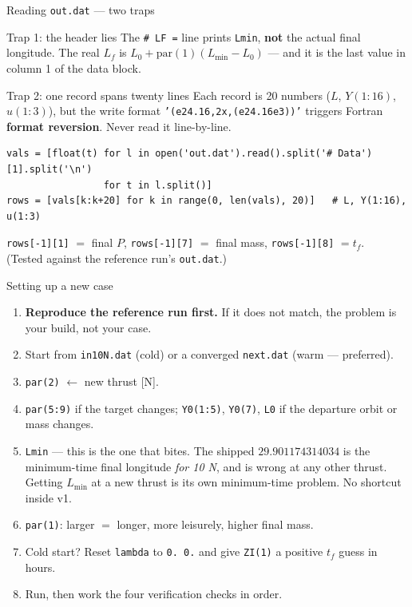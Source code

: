 \documentclass[10pt,aspectratio=169]{beamer}
\newcommand{\code}[1]{\texttt{\small #1}}
\newcommand{\file}[1]{\texttt{\small #1}}
\newcommand{\Lf}{L_f}
\begin{document}
\begin{frame}[fragile]{Reading \file{out.dat} --- two traps}

\begin{alertblock}{Trap 1: the header lies}
The \code{\# LF =} line prints \code{Lmin}, \textbf{not} the actual final
longitude. The real $\Lf$ is $L_0 + \mathrm{par}(1)(L_{\min}-L_0)$ --- and it
is the last value in column 1 of the data block.
\end{alertblock}

\begin{alertblock}{Trap 2: one record spans twenty lines}
Each record is 20 numbers ($L$, $Y(1{:}16)$, $u(1{:}3)$), but the write format
\code{'(e24.16,2x,(e24.16e3))'} triggers Fortran \textbf{format reversion}.
Never read it line-by-line.
\end{alertblock}

\begin{lstlisting}[style=py]
vals = [float(t) for l in open('out.dat').read().split('# Data')[1].split('\n')
                 for t in l.split()]
rows = [vals[k:k+20] for k in range(0, len(vals), 20)]   # L, Y(1:16), u(1:3)
\end{lstlisting}

\code{rows[-1][1]} $=$ final $P$, \quad \code{rows[-1][7]} $=$ final mass,
\quad \code{rows[-1][8]} $= t_f$. \\
(Tested against the reference run's \file{out.dat}.)
\end{frame}

\begin{frame}{Setting up a new case}

\begin{enumerate}
\item \textbf{Reproduce the reference run first.} If it does not match, the
      problem is your build, not your case.
\item Start from \file{in10N.dat} (cold) or a converged \file{next.dat}
      (warm --- preferred).
\item \code{par(2)} $\leftarrow$ new thrust [N].
\item \code{par(5:9)} if the target changes; \code{Y0(1:5)}, \code{Y0(7)},
      \code{L0} if the departure orbit or mass changes.
\item \alert{\code{Lmin} --- this is the one that bites.} The shipped
      $29.901174314034$ is the minimum-time final longitude \emph{for 10 N},
      and is wrong at any other thrust. Getting $L_{\min}$ at a new thrust is
      its own minimum-time problem. No shortcut inside v1.
\item \code{par(1)}: larger $=$ longer, more leisurely, higher final mass.
\item Cold start? Reset \code{lambda} to \code{0. 0.} and give \code{ZI(1)} a
      positive $t_f$ guess in hours.
\item Run, then work the four verification checks in order.
\end{enumerate}
\end{frame}
\end{document}
